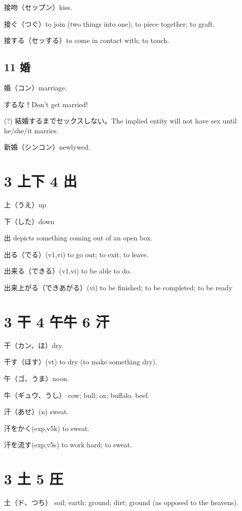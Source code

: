 接吻（セップン）kiss.

接ぐ（つぐ）to join (two things into one); to piece together; to graft.

接する（セッする）to come in contact with; to touch.

\subsection{11 婚}

婚（コン）marriage.

するな！Don't get married!

(?) 結婚するまでセックスしない。The implied entity will not have sex until he/she/it marries.

新婚（シンコン）newlywed.

\section{3 上下 4 出}

上（うえ）up

下（した）down

出 depicts something coming out of an open box.

出る（でる）(v1,vi) to go out; to exit; to leave.

出来る（できる）(v1,vi) to be able to do.

出来上がる（できあがる）(vi) to be finished; to be completed; to be ready

\section{3 干 4 午牛 6 汗}

干（カン、ほ）dry.

干す（ほす）(vt) to dry (to make something dry).

午（ゴ、うま）noon.

牛（ギュウ、うし）
cow; bull; ox; buffalo.
beef.

汗（あせ）(n) sweat.

汗をかく(exp,v5k) to sweat.

汗を流す(exp,v5s) to work hard; to sweat.

\section{3 土 5 圧}

土（ド、つち）
soil; earth; ground; dirt; ground (as opposed to the heavens).

